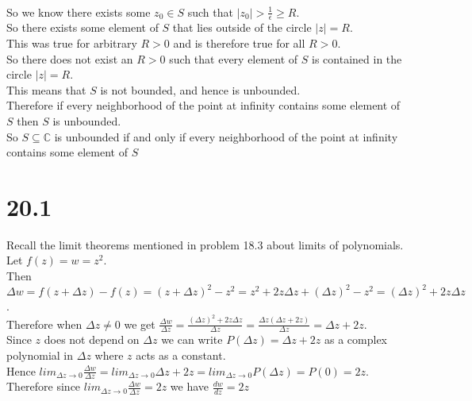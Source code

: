 \documentclass{article}
\begin{document}
\begin{center}
    \\So we know there exists some $z_0\in S$ such that $|z_0| >\frac{1}{\epsilon}\geq R$.
    \\So there exists some element of $S$ that lies outside of the circle $|z| = R$.
    \\This was true for arbitrary $R > 0$ and is therefore true for all $R > 0$.
    \\So there does not exist an $R > 0$ such that every element of $S$ is contained in the circle $|z| = R$.
    \\This means that $S$ is not bounded, and hence is unbounded.
    \\Therefore if every neighborhood of the point at infinity contains some element of $S$ then $S$ is unbounded.
    \break
    \\So $S\subseteq\mathbb{C}$ is unbounded if and only if every neighborhood of the point at infinity contains some element of $S$ \qedsymbol
\end{center}


\newpage
\section*{20.1}
\begin{center}
    \doublespacing
    Recall the limit theorems mentioned in problem 18.3 about limits of polynomials.
    \\Let $f(z) = w = z^2$.
    \\Then $\Delta w = f(z +\Delta z) - f(z) = (z +\Delta z)^2 - z^2 = z^2 + 2z\Delta z + (\Delta z)^2 - z^2 = (\Delta z)^2 + 2z\Delta z$.
    \\Therefore when $\Delta z\neq 0$ we get $\frac{\Delta w}{\Delta z} =\frac{(\Delta z)^2 + 2z\Delta z}{\Delta z} =\frac{\Delta z (\Delta z + 2z)}{\Delta z} =\Delta z + 2z$.
    \\Since $z$ does not depend on $\Delta z$ we can write $P(\Delta z) =\Delta z + 2z$ as a complex polynomial in $\Delta z$ where $z$ acts as a constant.
    \\Hence $lim _{\Delta z\rightarrow 0}\frac{\Delta w}{\Delta z} = lim _{\Delta z\rightarrow 0}\Delta z + 2z = lim _{\Delta z\rightarrow 0} P(\Delta z) = P(0) = 2z$.
    \\Therefore since $lim _{\Delta z\rightarrow 0}\frac{\Delta w}{\Delta z} = 2z$ we have $\frac{dw}{dz} = 2z$ \qedsymbol
\end{center}


\newpage
\end{document}
